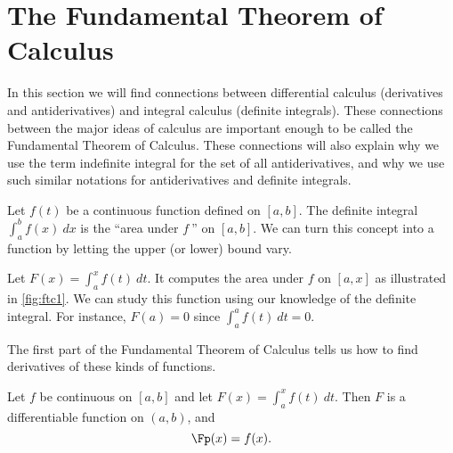 \section{The Fundamental Theorem of Calculus}\label{sec:FTC}

In this section we will find connections between differential calculus (derivatives and antiderivatives) and integral calculus (definite integrals). These connections between the major ideas of calculus are important enough to be called the Fundamental Theorem of Calculus. These connections will also explain why we use the term indefinite integral for the set of all antiderivatives, and why we use such similar notations for antiderivatives and definite integrals.

Let $f(t)$ be a continuous function defined on $[a,b]$. The definite integral $\int_a^b f(x)\ dx$ is the ``area under $f\ $'' on $[a,b]$. We can turn this concept into a function by letting the upper (or lower) bound vary.

Let $F(x) = \int_a^x f(t)\ dt$. It computes the area under $f$ on $[a,x]$ as illustrated in \autoref{fig:ftc1}. We can study this function using our knowledge of the definite integral. For instance, $F(a)=0$ since $\int_a^af(t)\ dt=0$. %


The first part of the Fundamental Theorem of Calculus tells us how to find derivatives of these kinds of functions.

{Let $f$ be continuous on $[a,b]$ and let $F(x) = \int_a^x f(t)\ dt$. Then $F$ is a differentiable function on $(a,b)$, and $$\Fp(x)=f(x).$$}

